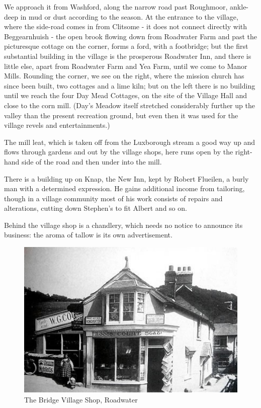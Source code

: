 We approach it from Washford, along the narrow road past Roughmoor, ankle-deep in mud or dust according to the season. At the entrance to the village, where the side-road comes in from Clitsome - it does not connect directly with Beggearnhuish - the open brook flowing down from Roadwater Farm and past the picturesque cottage on the corner, forms a ford, with a footbridge; but the first substantial building in the village is the prosperous Roadwater Inn, and there is little else, apart from Roadwater Farm and Yea Farm, until we come to Manor Mills. Rounding the corner, we see on the right, where the mission church has since been built, two cottages and a lime kiln; but on the left there is no building until we reach the four Day Mead Cottages, on the site of the Village Hall and close to the corn mill. (Day's Meadow itself stretched considerably further up the valley than the present recreation ground, but even then it was used for the village revels and entertainments.)

The mill leat, which is taken off from the Luxborough stream a good way up and flows through gardens and out by the village shops, here runs open by the right-hand side of the road and then under into the mill.

There is a building up on Knap, the New Inn, kept by Robert Flueilen, a burly man with a determined expression. He gains additional income from tailoring, though in a village community most of his work consists of repairs and alterations, cutting down Stephen's  to fit Albert and so on.

Behind the village shop is a chandlery, which needs no notice to announce its business: the aroma of tallow is its own advertisement.

\begin{figure}[p]
     \includegraphics[width=1\textwidth]{figures/bridgeVillageShop}
     \caption{The Bridge Village Shop, Roadwater}
     \label{fig:BridgeShop}
\end{figure}

